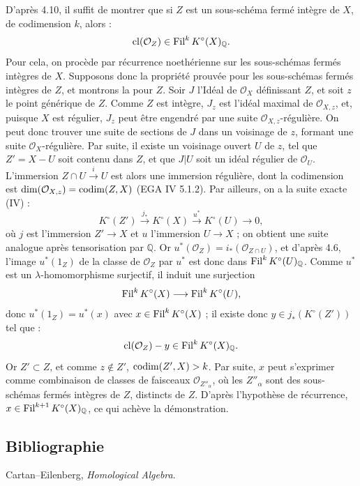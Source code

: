 D'après 4.10, il suffit de montrer que si \(Z\) est un sous-schéma fermé intègre de \(X\), de codimension \(k\), alors :
\[
  \operatorname{cl}(\mathcal O_Z)\in\operatorname{Fil}^kK^\circ(X)_{\mathbb Q}.
\]
Pour cela, on procède par récurrence noethérienne sur les sous-schémas fermés intègres de \(X\). Supposons donc la propriété prouvée pour les sous-schémas fermés intègres de \(Z\), et montrons la pour \(Z\). Soir \(J\) l'Idéal de \(\mathcal O_X\)
définissant \(Z\), et soit \(z\) le point générique de \(Z\). Comme \(Z\) est intègre, \(J_z\) est l'idéal maximal de \(\mathcal O_{X,z}\), et, puisque \(X\) est régulier, \(J_z\) peut être engendré par une suite \(\mathcal O_{X,z}\)-régulière. On peut donc trouver une suite de sections de \(J\) dans un voisinage de \(z\), formant une suite \(\mathcal O_X\)-régulière. Par suite, il existe un voisinage ouvert \(U\) de \(z\), tel que \(Z'=X-U\) soit contenu dans \(Z\), et que \(J|U\) soit un idéal régulier de \(\mathcal O_U\). L'immersion \(Z\cap U\xrightarrow{i}U\) est alors une immersion régulière, dont la codimension est \(\dim(\mathcal O_{X,z})=\operatorname{codim}(Z,X)\) (EGA IV 5.1.2). Par ailleurs, on a la suite exacte (IV\qquad) :
\[
  K^\circ(Z')\xrightarrow{j_*}K^\circ(X)
  \xrightarrow{u^*}K^\circ(U)\to0,
\]
où \(j\) est l'immersion \(Z'\to X\) et \(u\) l'immersion \(U\to X\) ; on obtient une suite analogue après tensorisation par \(\mathbb Q\). Or \(u^*(\mathcal O_Z)=i_*(\mathcal O_{Z\cap U})\), et d'après 4.6, l'image \(u^*(1_Z)\) de la classe de \(\mathcal O_Z\) par \(u^*\) est donc dans \(\operatorname{Fil}^kK^\circ(U)_{\mathbb Q}\). Comme \(u^*\) est un \(\lambda\)-homomorphisme surjectif, il induit une surjection
\[
  \operatorname{Fil}^kK^\circ(X)\longrightarrow \operatorname{Fil}^kK^\circ(U),
\]
donc \(u^*(1_Z)=u^*(x)\) avec \(x\in\operatorname{Fil}^kK^\circ(X)\) ; il existe donc \(y\in j_*(K^\circ(Z'))\) tel que :
\[
  \operatorname{cl}(\mathcal O_Z)-y\in\operatorname{Fil}^kK^\circ(X)_{\mathbb Q}.
\]
Or \(Z'\subset Z\), et comme \(z\notin Z'\), \(\operatorname{codim}(Z',X)>k\). Par suite, \(x\) peut s'exprimer comme combinaison de classes de faisceaux \(\mathcal O_{Z''_\alpha}\), où les \(Z''_\alpha\) sont des sous-schémas fermés intègres de \(Z\), distincts de \(Z\). D'après l'hypothèse de récurrence, \(x\in\operatorname{Fil}^{k+1}K^\circ(X)_{\mathbb Q}\), ce qui achève la démonstration.

\subsection*{Bibliographie}
\begin{enumerate}[label={[\arabic*]}]
\item Cartan--Eilenberg, \emph{Homological Algebra}.
\end{enumerate}



\providecommand{\etale}{\'etale}
\providecommand{\Ch}{\operatorname{Ch}}


